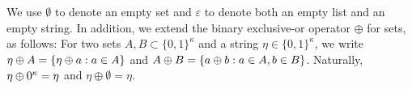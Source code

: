

\newcommand{\NumSets}{n}
\newcommand{\NumSync}{m}
\newcommand{\SecParam}{\kappa}
\newcommand{\EmptyList}{\varepsilon}
\newcommand{\GrindingPower}{g}
\newcommand{\GrindingMax}{\gamma}
\newcommand{\GrindingSet}{X^*}


We use $\emptyset$ to denote an empty set and 
$\varepsilon$ to denote both an empty list and an empty string. 
In addition, we extend the binary exclusive-or operator $\oplus$ for sets, as follows: 
For two sets $A,B \subset \{0,1\}^\kappa$ and a string $\eta \in \{0,1\}^\kappa$, 
we write
$\eta \oplus A = \{\eta \oplus a : a \in A\}$ and
$A \oplus B = \{a \oplus b : a \in A, b \in B\}$. 
Naturally, $\eta \oplus 0^{\kappa} = \eta$ and $\eta \oplus \emptyset = \eta$.







\renewcommand{\SS}[1]{P_{#1}, \ldots, P_{\ell}} %
\newcommand{\PP}[1]{P_{\ell+{#1}}, \ldots, P_{\ell + n}}
\newcommand{\HatPP}[2]{\hat{P}_{#1}, \ldots, \hat{P}_{#2}}
\newcommand{\PrimePP}[2]{P^\prime_{#1}, \ldots, P^\prime_{#2}}
\newcommand{\Sfull}{ P_1, \ldots, P_\ell}
\newcommand{\Pfull}{ P_{\ell+1}, \ldots, P_{\ell+n}}
\newcommand{\BB}[1]{b_{{#1}}, \ldots, b_{n}}
\newcommand{\WithEmpty}[1]{{#1} \Union \{ \ZeroString \}}
\newcommand{\WithLookahead}[1]{{#1} \Union \{ x \}}



